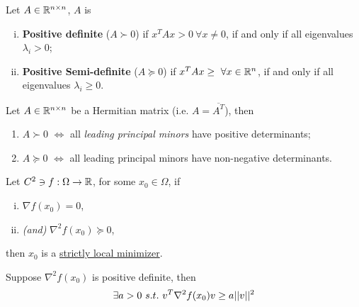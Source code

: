 \documentclass{article}
\begin{document}
	\begin{definition}
		Let $A \in \mathbb{R}^{n \times n}$, $A$ is 
		\begin{enumerate}[(i)]
			\item \textbf{Positive definite} ($A \succ 0$) if $x^T A x > 0\ \forall x \neq 0$, if and only if all eigenvalues $\lambda_i > 0$;
			\item \textbf{Positive Semi-definite} ($A \succcurlyeq 0$) if $x^T A x \geq\  \forall x \in \mathbb{R}^n$, if and only if all eigenvalues $\lambda_i \geq 0$.
		\end{enumerate}
	\end{definition}
   	
   	\begin{theorem}
   		Let $A \in \mathbb{R}^{n \times n}$ be a Hermitian matrix (i.e. $A = \overline{A^T}$), then
   		\begin{enumerate}
   			\item $A \succ 0$ $\iff$ all \emph{leading principal minors} have positive determinants;
   			\item $A \succcurlyeq 0$ $\iff$ all leading principal minors have non-negative determinants.
   		\end{enumerate}
   	\end{theorem}
   	
   	
   	\begin{theorem}
   		Let $C^2 \ni f: \Omega \to \mathbb{R}$, for some $x_0 \in \Omega$, if
   		\begin{enumerate}[(i)]
   			\item $\nabla f(x_0) = 0$,
   			\item \emph{(and)} $\nabla^2 f(x_0) \succcurlyeq 0$,
   		\end{enumerate}
   		then $x_0$ is a \ul{strictly local minimizer}.
   	\end{theorem}
   	
   	\begin{lemma}
   		Suppose $\nabla^2 f(x_0)$ is positive definite, then 
   		\begin{align}
   			\exists a > 0\ s.t.\ v^T \nabla^2 f(x_0) v \geq a \vert \vert {v} \vert \vert^2
   		\end{align}
   	\end{lemma}
   	
\end{document}
